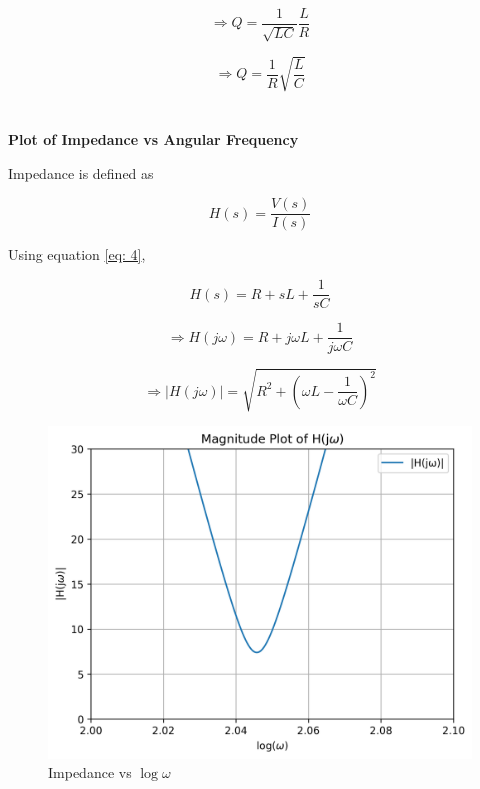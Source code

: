 \documentclass[journal,12pt,twocolumn]{IEEEtran}
\theoremstyle{remark}
\begin{document}
\begin{equation}
    \Rightarrow Q = \dfrac{1}{\sqrt{LC}}\dfrac{L}{R}
\end{equation}

\begin{equation}
    \Rightarrow Q = \dfrac{1}{R}\sqrt{\dfrac{L}{C}}
\end{equation}\\
\\
\textbf{Plot of Impedance vs Angular Frequency}

Impedance is defined as

\begin{equation}
    H(s) = \dfrac{V(s)}{I(s)}
\end{equation}

Using equation \eqref{eq: 4},

\begin{equation}
    H(s) = R + sL + \dfrac{1}{sC}
\end{equation}

\begin{equation}
    \Rightarrow H(j\omega) = R + j\omega L + \dfrac{1}{j\omega C}
\end{equation}

\begin{equation}
    \Rightarrow \lvert H(j\omega) \rvert = \sqrt{R^2 + \left(\omega L - \dfrac{1}{\omega C}\right)^2}
\end{equation}

\begin{figure}[h]
    \centering
    \includegraphics[width = 2.4 in, height = 1.6 in]{figs/h_plot.png}
    \caption{Impedance vs $\log\omega$}
    \label{fig:h_plot}
\end{figure}

\renewcommand{\thefigure}{\theenumi}
\renewcommand{\thetable}{\theenumi}
\end{document}
